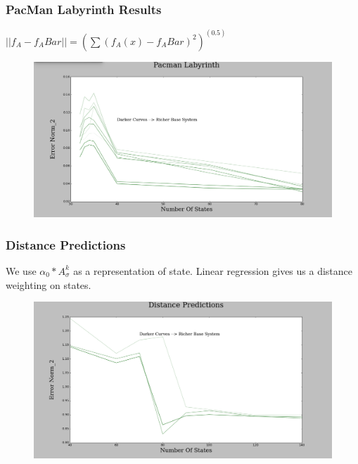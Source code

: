 \documentclass{beamer}
\begin{document}

\begin{frame}
\frametitle{PacMan Labyrinth Results}

$||f_A - f_ABar|| = (\sum (f_A(x) - f_ABar)^2)^(0.5)$ 

\begin{figure}
\includegraphics[width=0.8\linewidth]{lucasplots/monImages/PacmanLabyrinth.png}
\end{figure}
\end{frame}


\begin{frame}
\frametitle{Distance Predictions}
We use $\alpha_0*A_\sigma^k$ as a representation of state. Linear regression gives us a distance weighting on states.
\begin{figure}
\includegraphics[width=0.8\linewidth]{lucasplots/monImages/Distance_Predictions.png}
\end{figure}
\end{frame}
\end{document}
